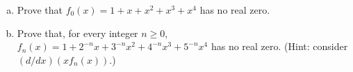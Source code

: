 \begin{enumerate}[(a)]

\item Prove that $f_0(x) = 1 + x + x^2 + x^3 + x^4$ has no real zero.
\item Prove that, for every integer $n \ge 0$, $f_n(x) = 1+2^{-n} x+3^{-n} x^2
      +4^{-n} x^3 + 5^{-n} x^4$ has no real zero. (Hint: consider $(d/dx)(x
      f_n(x))$.)

\end{enumerate}
